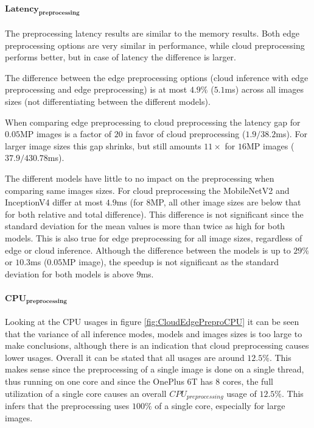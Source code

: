 \paragraph{$\mathbf{Latency_{preprocessing}}$}
The preprocessing latency results are similar to the memory results. Both edge preprocessing options are very similar in performance, while cloud preprocessing performs better, but in case of latency the difference is larger.

The difference between the edge preprocessing options (cloud inference with edge preprocessing and edge preprocessing) is at most $4.9\%$ ($5.1$ms) across all images sizes (not differentiating between the different models).

When comparing edge preprocessing to cloud preprocessing the latency gap for $0.05$MP images is a factor of $20$ in favor of cloud preprocessing ($1.9/38.2$ms). For larger image sizes this gap shrinks, but still amounts $11\times$ for $16$MP images ($37.9/430.78$ms).

The different models have little to no impact on the preprocessing when comparing same images sizes.
For cloud preprocessing the MobileNetV2 and InceptionV4 differ at most $4.9$ms (for $8$MP, all other image sizes are below that for both relative and total difference). This difference is not significant since the standard deviation for the mean values is more than twice as high for both models.
This is also true for edge preprocessing for all image sizes, regardless of edge or cloud inference.
Although the difference between the models is up to $29\%$ or $10.3$ms ($0.05$MP image), the speedup is not significant as the standard deviation for both models is above $9$ms.

\paragraph{$\mathbf{CPU_{preprocessing}}$}
Looking at the CPU usages in figure \ref{fig:CloudEdgePreproCPU} it can be seen that the variance of all inference modes, models and images sizes is too large to make conclusions, although there is an indication that cloud preprocessing causes lower usages.
Overall it can be stated that all usages are around $12.5\%$. This makes sense since the preprocessing of a single image is done on a single thread, thus running on one core and since the OnePlus 6T has 8 cores, the full utilization of a single core causes an overall $CPU_{preprocessing}$  usage of $12.5\%$. 
This infers that the preprocessing uses $100\%$ of a single core, especially for large images.

